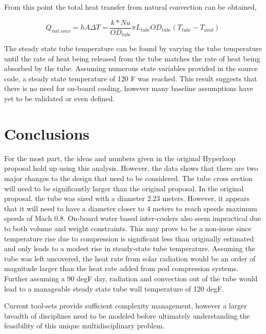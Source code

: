\documentclass[heading.tex]{subfiles}
\begin{document}
From this point the total heat transfer from natural convection can be obtained,

\begin{equation*}
Q_{nat. conv} = hA \Delta T = \frac{k*Nu}{ {OD}_{tube}} \pi {L}_{tube} {OD}_{tube} (T_{tube}-T_{amb})
\end{equation*}

The steady state tube temperature can be found by varying the tube temperature until the rate of heat being released from the tube
matches the rate of heat being absorbed by the tube.
Assuming numerous state variables provided in the source code, a steady state temperature of 120 F was reached.
This result suggests that there is no need for on-board cooling, however many baseline assumptions have yet to be validated or even defined.

\section{Conclusions}



For the most part, the ideas and numbers given in the original Hyperloop proposal hold up using this analysis. However, the data shows that
there are two major changes to the design that need to be considered.
The tube cross section will need to be significantly larger than the original proposal. In the original proposal, the tube was sized with a diameter 2.23
meters. However, it appears that it will need to have a diameter closer to 4 meters to reach speeds maximum speeds of Mach 0.8.
On-board water based inter-coolers also seem impractical due to both volume and weight constraints. This may prove to be a non-issue since
temperature rise due to compression is significant less than originally estimated and only leads to a modest rise in steady-state tube
temperature. Assuming the tube was left uncovered, the heat rate from solar radiation would be an order of magnitude larger than the heat
rate added from pod compression systems. Further assuming a 90 degF day, radiation and convection out of the tube would lead to a
manageable steady state tube wall temperature of 120 degF.

Current tool-sets provide sufficient complexity management, however a larger breadth of disciplines need to be modeled before ultimately
understanding the feasibility of this unique multidisciplinary problem.
\end{document}
